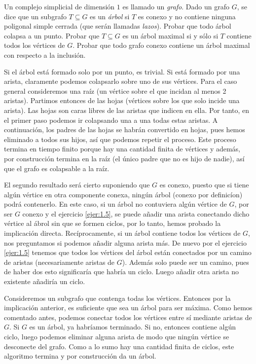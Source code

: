 \documentclass[twoside]{article}
\begin{document}
\newpage

\begin{ejercicio}{1.7}
Un complejo simplicial de dimensión $1$ es llamado un \emph{grafo}.
Dado un grafo $G$, se dice que un subgrafo $T \subseteq G$ es un \emph{árbol} si $T$ es conexo y no contiene ninguna poligonal simple cerrada (que serán llamadas \emph{lazos}).
Probar que todo árbol colapsa a un punto.
Probar que $T \subseteq G$ es un árbol maximal si y sólo si $T$ contiene todos los vértices de $G$.
Probar que todo grafo conexo contiene un árbol maximal con respecto a la inclusión.
\end{ejercicio}
\begin{solucion}
Si el árbol está formado solo por un punto, es trivial. Si está formado por una arista, claramente podemos colapsarlo sobre uno de sus vértices. Para el caso general consideremos una raíz (un vértice sobre el que incidan al menos 2 aristas). Partimos entonces de las hojas (vértices sobre los que solo incide una arista). Las hojas son caras libres de las aristas que indicen en ella. Por tanto, en el primer paso podemos ir colapsando una a una todas estas aristas. A continuación, los padres de las hojas se habrán convertido en hojas, pues hemos eliminado a todos sus hijos, así que podemos repetir el proceso. Este proceso termina en tiempo finito porque hay una cantidad finita de vértices y además, por construcción termina en la raíz (el único padre que no es hijo de nadie), así que el grafo es colapsable a la raíz.

El segundo resultado será cierto suponiendo que $G$ es conexo, puesto que si tiene algún vértice en otra componente conexa, ningún árbol (conexo por definicíon) podrá contenerlo. En este caso, si un árbol no contuviera algún vértice de $G$, por ser $G$ conexo y el ejercicio \ref{ejer:1.5}, se puede añadir una arista conectando dicho vértice al ábrol sin que se formen ciclos, por lo tanto, hemos probado la implicación directa. Recíprocamente, si un árbol contiene todos los vértices de $G$, nos preguntamos si podemos añadir alguna arista más. De nuevo por el ejercicio \ref{ejer:1.5} tenemos que todos los vértices del árbol están conectados por un camino de aristas (necesariamente aristas de $G$). Además solo puede ser un camino, pues de haber dos esto significaría que habría un ciclo. Luego añadir otra arista no existente añadiría un ciclo.

Consideremos un subgrafo que contenga todas los vértices. Entonces por la implicación anterior, es suficiente que sea un árbol para ser máxima. Como hemos comentado antes, podemos conectar todos los vértices entre sí mediante aristas de $G$. Si $G$ es un árbol, ya habríamos terminado. Si no, entonces contiene algún ciclo, luego podemos eliminar alguna arista de modo que ningún vértice se desconecte del grafo. Como a lo sumo hay una cantidad finita de ciclos, este algoritmo termina y por construcción da un árbol. 
\end{solucion}
\end{document}
